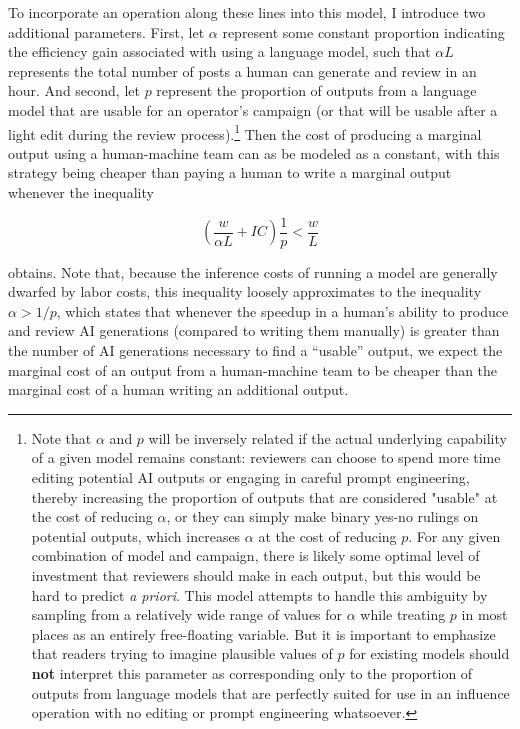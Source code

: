 \documentclass{article}
\begin{document}
To incorporate an operation along these lines into this model, I introduce two additional parameters. First, let $\alpha$ represent some constant proportion indicating the efficiency gain associated with using a language model, such that $\alpha L$ represents the total number of posts a human can generate and review in an hour. And second, let $p$ represent the proportion of outputs from a language model that are usable for an operator's campaign (or that will be usable after a light edit during the review process).\footnote{Note that $\alpha$ and $p$ will be inversely related if the actual underlying capability of a given model remains constant: reviewers can choose to spend more time editing potential AI outputs or engaging in careful prompt engineering, thereby increasing the proportion of outputs that are considered "usable" at the cost of reducing $\alpha$, or they can simply make binary yes-no rulings on potential outputs, which increases $\alpha$ at the cost of reducing $p$. For any given combination of model and campaign, there is likely some optimal level of investment that reviewers should make in each output, but this would be hard to predict \textit{a priori}. This model attempts to handle this ambiguity by sampling from a relatively wide range of values for $\alpha$ while treating $p$ in most places as an entirely free-floating variable. But it is important to emphasize that readers trying to imagine plausible values of $p$ for existing models should \textbf{not} interpret this parameter as corresponding only to the proportion of outputs from language models that are perfectly suited for use in an influence operation with no editing or prompt engineering whatsoever.} Then the cost of producing a marginal output using a human-machine team can as be modeled as a constant, with this strategy being cheaper than paying a human to write a marginal output whenever the inequality 

\begin{equation}
  \left( \frac{w}{\alpha L} + IC \right) \frac{1}{p} < \frac{w}{L}
  \label{eq:inequality}
\end{equation}

obtains. Note that, because the inference costs of running a model are generally dwarfed by labor costs, this inequality loosely approximates to the inequality $\alpha > 1/p$, which states that whenever the speedup in a human's ability to produce and review AI generations (compared to writing them manually) is greater than the number of AI generations necessary to find a ``usable'' output, we expect the marginal cost of an output from a human-machine team to be cheaper than the marginal cost of a human writing an additional output. 
\end{document}
